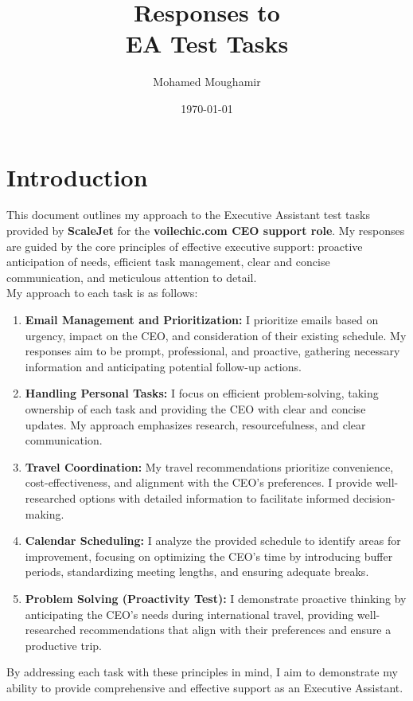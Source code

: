 \documentclass{article}
\title{Responses to\\ EA Test Tasks}
\author{Mohamed Moughamir}
\date{\today}
\begin{document}

\maketitle
\newpage
\vfill
\section*{Introduction}
This document outlines my approach to the Executive Assistant test tasks provided by \textbf{ScaleJet} for the \textbf{voilechic.com CEO support role}. My responses are guided by the core principles of effective executive support: proactive anticipation of needs, efficient task management, clear and concise communication, and meticulous attention to detail.\\

My approach to each task is as follows:
\begin{enumerate}
    \item \textbf{Email Management and Prioritization:} I prioritize emails based on urgency, impact on the CEO, and consideration of their existing schedule. My responses aim to be prompt, professional, and proactive, gathering necessary information and anticipating potential follow-up actions.
    \item \textbf{Handling Personal Tasks:} I focus on efficient problem-solving, taking ownership of each task and providing the CEO with clear and concise updates. My approach emphasizes research, resourcefulness, and clear communication.
    \item \textbf{Travel Coordination:} My travel recommendations prioritize convenience, cost-effectiveness, and alignment with the CEO's preferences. I provide well-researched options with detailed information to facilitate informed decision-making.
    \item \textbf{Calendar Scheduling:} I analyze the provided schedule to identify areas for improvement, focusing on optimizing the CEO's time by introducing buffer periods, standardizing meeting lengths, and ensuring adequate breaks.
\item \textbf{Problem Solving (Proactivity Test):} I demonstrate proactive thinking by anticipating the CEO's needs during international travel, providing well-researched recommendations that align with their preferences and ensure a productive trip.
\end{enumerate}


By addressing each task with these principles in mind, I aim to demonstrate my ability to provide comprehensive and effective support as an Executive Assistant.
\vfill
\tableofcontents
\vfill
\newpage
\end{document}
